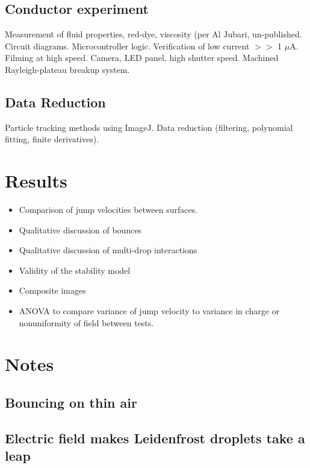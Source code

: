 \documentclass{jfm}
\begin{document}
\subsection{Conductor experiment}
Measurement of fluid properties, red-dye, viscosity (per Al Jubari, un-published. Circuit diagrams. Microcontroller logic. Verification of low current $>>$ 1 $\mu$A. Filming at high speed. Camera, LED panel, high shutter speed. Machined Rayleigh-plateau breakup system.
\subsection{Data Reduction}
Particle tracking methods using ImageJ. Data reduction (filtering, polynomial fitting, finite derivatives).

\section{Results}
\begin{itemize}
\item Comparison of jump velocities between surfaces.
\item Qualitative discussion of bounces
\item Qualitative discussion of multi-drop interactions
\item Validity of the stability model
\item Composite images
\item ANOVA to compare variance of jump velocity to variance in charge or nonuniformity of field between tests.
\end{itemize}

\section{Notes}
\subsection{Bouncing on thin air}
\subsection{Electric field makes Leidenfrost droplets take a leap}
\end{document}
